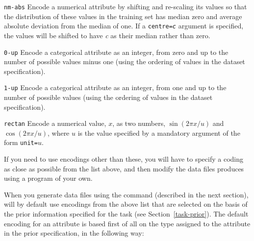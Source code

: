 \begin{list}{}{\setlength{\labelwidth}{0.7in} \setlength{\labelsep}{0.1in}%
\setlength{\leftmargin}{1.1in}}
\item[{\tt nm-abs}\hfill] 
Encode a numerical attribute by shifting and re-scaling its values 
so that the distribution of these values in the training set has 
median zero and average absolute deviation from the median of 
one.  If a \texttt{centre={\rm\em c}} argument is specified, the 
values will be shifted to have \emph{c} as their median rather than zero.

\item[{\tt 0-up}\hfill] 
Encode a categorical attribute as an integer, from zero and up to the
number of possible values minus one (using the ordering of values in
the dataset specification).

\item[{\tt 1-up}\hfill] 
Encode a categorical attribute as an integer, from one and up to the
number of possible values (using the ordering of values in the dataset
specification).

\item[{\tt rectan}\hfill] 
Encode a numerical value, $x$, as two numbers, $\sin(2\pi x/u)$ 
and $\cos(2\pi x/u)$, where $u$ is the value specified by a mandatory
argument of the form \texttt{unit={\rm$u$}}.

\end{list}\vspace{-4pt}

If you need to use encodings other than these, you will have to
specify a coding as close as possible from the list above, and then
modify the data files \delve{} produces using a program of your own.

When you generate data files using the \mgendata{} command (described
in the next section), \delve{} will by default use encodings from the
above list that are selected on the basis of the prior information
specified for the task (see Section~\ref{task-prior}).  The default
encoding for an attribute is based first of all on the type assigned
to the attribute in the prior specification, in the following
way:\vspace{-4pt}

